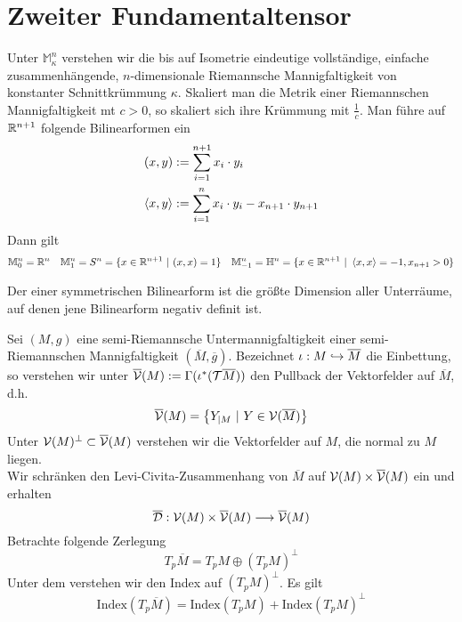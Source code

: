 \documentclass{book}
\renewcommand{\M}{\mathbb{M}}
\renewcommand{\l}[1]{\overline{#1}}
\begin{document}
\section{Zweiter Fundamentaltensor}
\Def{}
Unter $\M_\kappa^n$ verstehen wir die bis auf Isometrie eindeutige vollständige, einfache zusammenhängende, $n$-dimensionale Riemannsche Mannigfaltigkeit von konstanter Schnittkrümmung $\kappa$.
\Bem{}
Skaliert man die Metrik einer Riemannschen Mannigfaltigkeit mt $c > 0$, so skaliert sich ihre Krümmung mit $\frac{1}{c}$.
\Bsp{}
Man führe auf $\mathbb{R}^{n+1}$ folgende Bilinearformen ein
\begin{align*}
(x,y) &:= \sum_{i = 1}^{n+1}x_i \cdot y_i\\
\left<x,y\right> &:= \sum_{i = 1}^{n}x_i \cdot y_i - x_{n+1} \cdot y_{n+1}\\
\end{align*}
Dann gilt
\begin{align*}
\M_0^n = \R^n && \M_1^n = S^n = \{x \in \R^{n+1} ~|~ (x,x) = 1\} && \M_{-1}^n = \H^n = \{ x \in \R^{n+1} ~|~ \shrp{x,x} = -1, x_{n+1} > 0 \} 
\end{align*}

\Def{}
Der  einer symmetrischen Bilinearform ist die größte Dimension aller Unterräume, auf denen jene Bilinearform negativ definit ist.

\Def{}
Sei $(M,g)$ eine semi-Riemannsche Untermannigfaltigkeit einer semi-Riemannschen Mannigfaltigkeit $(\l M,\l g)$. Bezeichnet $\iota : M \inj{} \l M$ die Einbettung, so verstehen wir unter $\l\V(M) := \Gamma(\iota^*(\T\l M))$ den Pullback der Vektorfelder auf $\l M$, d.h.
\[ \l\V(M) = \set{Y_{|M}}{Y \in \V(\l M)} \]
Unter $\V(M)^\bot \subset \l \V(M)$ verstehen wir die Vektorfelder auf $M$, die normal zu $M$ liegen.\\
Wir schränken den Levi-Civita-Zusammenhang von $\l M$ auf $\V(M) \times \l\V(M)$ ein und erhalten
\[ \l\D : \V(M) \times \l\V(M) \Pfeil{} \l\V(M) \]
Betrachte folgende Zerlegung
\[ T_p\l M = T_pM \oplus (T_pM)^\bot \]
Unter dem  verstehen wir den Index auf $(T_pM)^\bot$. Es gilt
\[ \text{Index}(T_p\l M) = \text{Index}(T_pM) + \text{Index}(T_pM)^\bot \]
\end{document}

